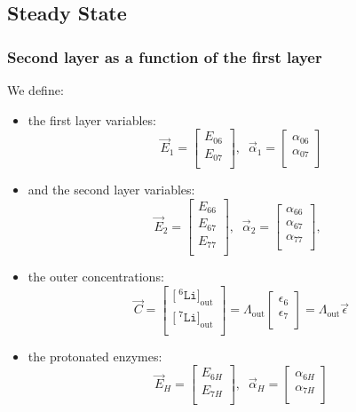 \documentclass[aps,onecolumn,11pt]{revtex4}
\newcommand{\mychem}[1]{\mathtt{#1}}
\newcommand{\myconc}[1]{\big[#1\big]}
\newcommand{\spLi}[1]{{\!~^{#1}\mychem{Li}}}
\newcommand{\Li}[1]{\myconc{\spLi{#1}}}
\newcommand{\myout}[1]{{#1}_{\mathrm{out}}}
\newcommand{\LiOut}[1]{\myout{\Li{#1}}}
\newcommand{\LiAll}{\Lambda}
\newcommand{\LiAllOut}{\myout{\LiAll}}
\begin{document}
\subsection{Steady State}


\subsubsection{Second layer as a function of the first layer}

We define:
\begin{itemize}
\item the first layer variables:
\begin{equation}
	\vec{E}_1 = \begin{bmatrix}
	E_{06}\\
	E_{07}\\
	\end{bmatrix}, \;\; 
	\vec{\alpha}_{1} = 
	\begin{bmatrix}
	\alpha_{06}\\
	\alpha_{07}\\
	\end{bmatrix}
\end{equation}
\item and the second layer variables:
\begin{equation}
	\vec{E}_2 = \begin{bmatrix}
	E_{66}\\
	E_{67}\\
	E_{77}\\
	\end{bmatrix},\;\;
	\vec{\alpha}_2 = \begin{bmatrix}
	\alpha_{66}\\
	\alpha_{67}\\
	\alpha_{77}\\
	\end{bmatrix},\;\;
\end{equation}
\item the outer concentrations:
\begin{equation}
\label{eq:C}
	\vec{C} = 
	\begin{bmatrix}
	\LiOut{6}\\
	\LiOut{7}\\
	\end{bmatrix}
	=
	\LiAllOut
	\begin{bmatrix}
	\epsilon_6\\
	\epsilon_7\\
	\end{bmatrix}
	=
	\LiAllOut\vec{\epsilon}
\end{equation}
\item the protonated enzymes:
\begin{equation}
	\vec{E}_H = 
	\begin{bmatrix}
	E_{6H}\\
	E_{7H}\\
	\end{bmatrix},\;\;
\vec{\alpha}_H = 
	\begin{bmatrix}
	\alpha_{6H}\\
	\alpha_{7H}\\
	\end{bmatrix} 
\end{equation}


\end{itemize}
\end{document}
